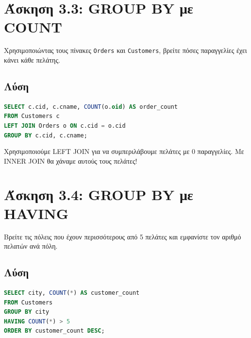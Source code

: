 \section{Άσκηση 3.3: GROUP BY με COUNT}

\begin{formulabox}[Εκφώνηση]
Χρησιμοποιώντας τους πίνακες \texttt{Orders} και \texttt{Customers}, βρείτε πόσες
παραγγελίες έχει κάνει κάθε πελάτης.
\end{formulabox}

\subsection*{Λύση}

\begin{lstlisting}[language=SQL]
SELECT c.cid, c.cname, COUNT(o.oid) AS order_count
FROM Customers c
LEFT JOIN Orders o ON c.cid = o.cid
GROUP BY c.cid, c.cname;
\end{lstlisting}

\begin{warningbox}
Χρησιμοποιούμε LEFT JOIN για να συμπεριλάβουμε πελάτες με 0 παραγγελίες.
Με INNER JOIN θα χάναμε αυτούς τους πελάτες!
\end{warningbox}

\section{Άσκηση 3.4: GROUP BY με HAVING}

\begin{formulabox}[Εκφώνηση]
Βρείτε τις πόλεις που έχουν περισσότερους από 5 πελάτες και εμφανίστε τον αριθμό
πελατών ανά πόλη.
\end{formulabox}

\subsection*{Λύση}

\begin{lstlisting}[language=SQL]
SELECT city, COUNT(*) AS customer_count
FROM Customers
GROUP BY city
HAVING COUNT(*) > 5
ORDER BY customer_count DESC;
\end{lstlisting}

